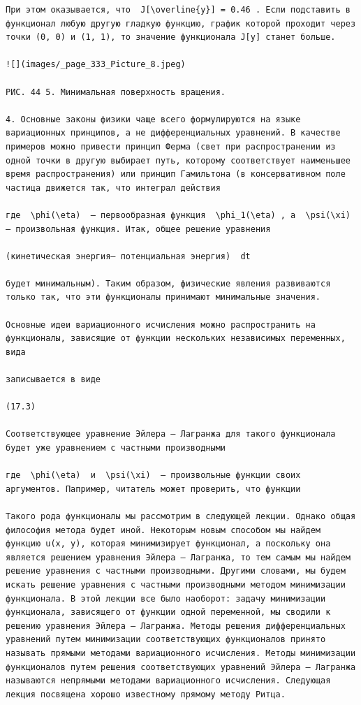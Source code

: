 \documentclass[
  ukrainian,
]{article}
\begin{document}
\begin{verbatim}
При этом оказывается, что  J[\overline{y}] = 0.46 . Если подставить в функционал любую другую гладкую функцию, график которой проходит через точки (0, 0) и (1, 1), то значение функционала J[y] станет больше.

![](images/_page_333_Picture_8.jpeg)

РИС. 44 5. Минимальная поверхность вращения.

4. Основные законы физики чаще всего формулируются на языке вариационных принципов, а не дифференциальных уравнений. В качестве примеров можно привести принцип Ферма (свет при распространении из одной точки в другую выбирает путь, которому соответствует наименьшее время распространения) или принцип Гамильтона (в консервативном поле частица движется так, что интеграл действия

где  \phi(\eta)  — первообразная функция  \phi_1(\eta) , а  \psi(\xi)  — произвольная функция. Итак, общее решение уравнения

(кинетическая энергия— потенциальная энергия)  dt

будет минимальным). Таким образом, физические явления развиваются только так, что эти функционалы принимают минимальные значения.

Основные идеи вариационного исчисления можно распространить на функционалы, зависящие от функции нескольких независимых переменных, вида

записывается в виде

(17.3)

Соответствующее уравнение Эйлера — Лагранжа для такого функционала будет уже уравнением с частными производными

где  \phi(\eta)  и  \psi(\xi)  — произвольные функции своих аргументов. Папример, читатель может проверить, что функции

Такого рода функционалы мы рассмотрим в следующей лекции. Однако общая философия метода будет иной. Некоторым новым способом мы найдем функцию u(x, y), которая минимизирует функционал, а поскольку она является решением уравнения Эйлера — Лагранжа, то тем самым мы найдем решение уравнения с частными производными. Другими словами, мы будем искать решение уравнения с частными производными методом минимизации функционала. В этой лекции все было наоборот: задачу минимизации функционала, зависящего от функции одной переменной, мы сводили к решению уравнения Эйлера — Лагранжа. Методы решения дифференциальных уравнений путем минимизации соответствующих функционалов принято называть прямыми методами вариационного исчисления. Методы минимизации функционалов путем решения соответствующих уравнений Эйлера — Лагранжа называются непрямыми методами вариационного исчисления. Следующая лекция посвящена хорошо известному прямому методу Ритца.


\end{verbatim}
\end{document}
